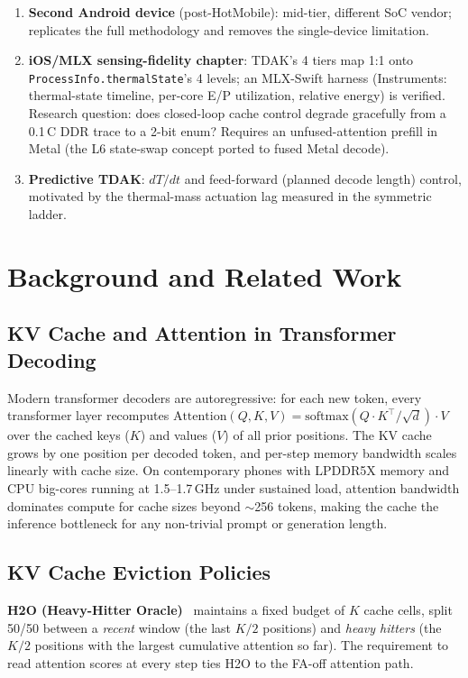 \documentclass[sigconf, anonymous=false, screen=true]{acmart}
\begin{document}
\begin{enumerate}[leftmargin=*, itemsep=1pt]
\item \textbf{Second Android device} (post-HotMobile): mid-tier, different SoC vendor; replicates the full methodology and removes the single-device limitation.
\item \textbf{iOS/MLX sensing-fidelity chapter}: TDAK's 4 tiers map 1:1 onto \texttt{ProcessInfo.thermalState}'s 4 levels; an MLX-Swift harness (Instruments: thermal-state timeline, per-core E/P utilization, relative energy) is verified. Research question: does closed-loop cache control degrade gracefully from a 0.1\,\textdegree C DDR trace to a 2-bit enum? Requires an unfused-attention prefill in Metal (the L6 state-swap concept ported to fused Metal decode).
\item \textbf{Predictive TDAK}: $dT/dt$ and feed-forward (planned decode length) control, motivated by the thermal-mass actuation lag measured in the symmetric ladder.
\end{enumerate}

\section{Background and Related Work}
\label{sec:related}

\subsection{KV Cache and Attention in Transformer Decoding}

Modern transformer decoders are autoregressive: for each new token, every transformer layer recomputes $\mathrm{Attention}(Q, K, V) = \mathrm{softmax}(Q \cdot K^\top / \sqrt{d}) \cdot V$ over the cached keys ($K$) and values ($V$) of all prior positions. The KV cache grows by one position per decoded token, and per-step memory bandwidth scales linearly with cache size. On contemporary phones with LPDDR5X memory and CPU big-cores running at 1.5--1.7\,GHz under sustained load, attention bandwidth dominates compute for cache sizes beyond $\sim$256 tokens, making the cache the inference bottleneck for any non-trivial prompt or generation length.

\subsection{KV Cache Eviction Policies}

\textbf{H2O (Heavy-Hitter Oracle)}~\cite{zhang2023h2o} maintains a fixed budget of $K$ cache cells, split 50/50 between a \emph{recent} window (the last $K/2$ positions) and \emph{heavy hitters} (the $K/2$ positions with the largest cumulative attention so far). The requirement to read attention scores at every step ties H2O to the FA-off attention path.
\end{document}
